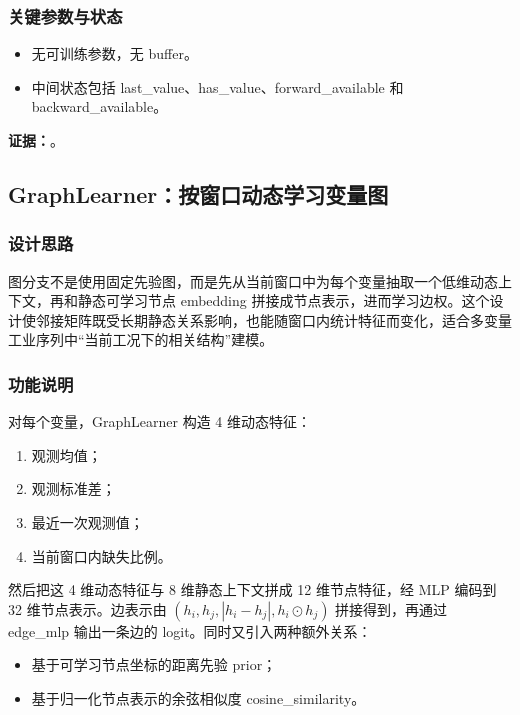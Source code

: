 \documentclass[11pt,a4paper]{ctexart}
\newcommand{\code}[1]{{\ttfamily\small #1}}
\newcommand{\evidence}[1]{\textbf{证据：}#1}
\begin{document}
\subsubsection{关键参数与状态}

\begin{itemize}
  \item 无可训练参数，无 buffer。
  \item 中间状态包括 \code{last\_value}、\code{has\_value}、\code{forward\_available} 和 \code{backward\_available}。
\end{itemize}

\evidence{。}

\subsection{GraphLearner：按窗口动态学习变量图}

\subsubsection{设计思路}

图分支不是使用固定先验图，而是先从当前窗口中为每个变量抽取一个低维动态上下文，再和静态可学习节点 embedding 拼接成节点表示，进而学习边权。这个设计使邻接矩阵既受长期静态关系影响，也能随窗口内统计特征而变化，适合多变量工业序列中“当前工况下的相关结构”建模。

\subsubsection{功能说明}

对每个变量，\code{GraphLearner} 构造 4 维动态特征：
\begin{enumerate}
  \item 观测均值；
  \item 观测标准差；
  \item 最近一次观测值；
  \item 当前窗口内缺失比例。
\end{enumerate}

然后把这 4 维动态特征与 8 维静态上下文拼成 12 维节点特征，经 MLP 编码到 32 维节点表示。边表示由 $(h_i, h_j, |h_i-h_j|, h_i \odot h_j)$ 拼接得到，再通过 \code{edge\_mlp} 输出一条边的 logit。同时又引入两种额外关系：
\begin{itemize}
  \item 基于可学习节点坐标的距离先验 \code{prior}；
  \item 基于归一化节点表示的余弦相似度 \code{cosine\_similarity}。
\end{itemize}
\end{document}
